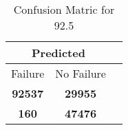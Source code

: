 \begin{table}[] 
\caption{Confusion Matric for 92.5} 
\label{Table: Prediction Accuracy-DMD92.5OnlySunEKF-resetReflectionEKF-top2-Reflection} 
\centering 
\begin{tabular} 
 {@{}ccc@{}} 
\toprule 
\multicolumn{2}{c}{\textbf{Predicted}}
 \\ \midrule 
\multicolumn{1}{|c|}{Failure} & 
\multicolumn{1}{c|}{No Failure}
 \\ \midrule 
\multicolumn{1}{|c|}{\color{green}\textbf{92537}} & 
\multicolumn{1}{c|}{\color{red}\textbf{29955}}
 \\ \midrule 
\multicolumn{1}{|c|}{\color{red}\textbf{160}} & 
\multicolumn{1}{c|}{\color{green}\textbf{47476}}
 \\ \bottomrule 
\end{tabular} 
\end{table} 
